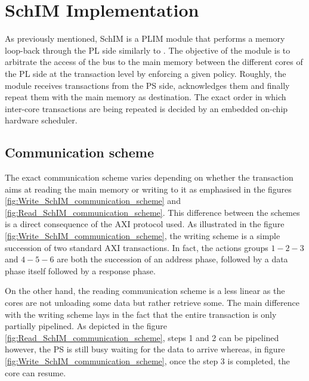 \section{SchIM Implementation}
    As previously mentioned, SchIM is a PLIM module that performs a memory loop-back through the PL side similarly to \cite{PLIM20}.
    The objective of the module is to arbitrate the access of the bus to the main memory between the different cores of the PL side at the transaction level by enforcing a given policy.
    Roughly, the module receives transactions from the PS side, acknowledges them and finally repeat them with the main memory as destination.
    The exact order in which inter-core transactions are being repeated is decided by an embedded on-chip hardware scheduler.

    \subsection{Communication scheme}
        The exact communication scheme varies depending on whether the transaction aims at reading the main memory or writing to it as emphasised in the figures \ref{fig:Write_SchIM_communication_scheme} and \ref{fig:Read_SchIM_communication_scheme}.
        This difference between the schemes is a direct consequence of the AXI protocol used.
        As illustrated in the figure \ref{fig:Write_SchIM_communication_scheme}, the writing scheme is a simple succession of two standard AXI transactions. In fact, the actions groups $1-2-3$ and $4-5-6$ are both the succession of an address phase, followed by a data phase itself followed by a response phase.

        On the other hand, the reading communication scheme is a less linear as the cores are not unloading some data but rather retrieve some.
        The main difference with the writing scheme lays in the fact that the entire transaction is only partially pipelined.
        As depicted in the figure \ref{fig:Read_SchIM_communication_scheme}, steps 1 and 2 can be pipelined however, the PS is still busy waiting for the data to arrive whereas, in figure \ref{fig:Write_SchIM_communication_scheme}, once the step 3 is completed, the core can resume.

